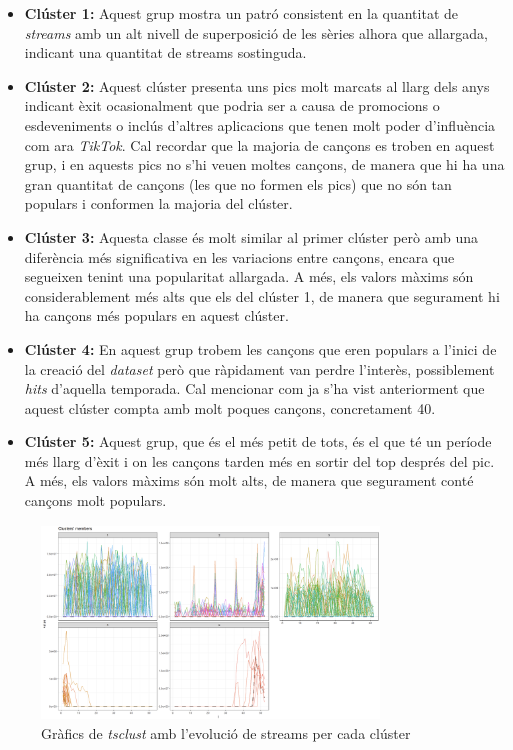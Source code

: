 \documentclass{article}
\begin{document}
\begin{itemize}
    \item \textbf{Clúster 1:} Aquest grup mostra un patró consistent en la quantitat de \textit{streams} amb un alt nivell de superposició de les sèries alhora que allargada, indicant una quantitat de streams sostinguda.
    
    \item \textbf{Clúster 2:} Aquest clúster presenta uns pics molt marcats al llarg dels anys indicant èxit ocasionalment que podria ser a causa de promocions o esdeveniments o inclús d'altres aplicacions que tenen molt poder d'influència com ara \textit{TikTok}. Cal recordar que la majoria de cançons es troben en aquest grup, i en aquests pics no s'hi veuen moltes cançons, de manera que hi ha una gran quantitat de cançons (les que no formen els pics) que no són tan populars i conformen la majoria del clúster.
    
    \item \textbf{Clúster 3:} Aquesta classe és molt similar al primer clúster però amb una diferència més significativa en les variacions entre cançons, encara que segueixen tenint una popularitat allargada. A més, els valors màxims són considerablement més alts que els del clúster 1, de manera que segurament hi ha cançons més populars en aquest clúster.
    
    \item \textbf{Clúster 4:} En aquest grup trobem les cançons que eren populars a l'inici de la creació del \textit{dataset} però que ràpidament van perdre l'interès, possiblement \textit{hits} d'aquella temporada. Cal mencionar com ja s'ha vist anteriorment que aquest clúster compta amb molt poques cançons, concretament 40.
    
    \item \textbf{Clúster 5:} Aquest grup, que és el més petit de tots, és el que té un període més llarg d'èxit i on les cançons tarden més en sortir del top després del pic. A més, els valors màxims són molt alts, de manera que segurament conté cançons molt populars.
\end{itemize}


\begin{figure}[H]
    \centering
    \includegraphics[width=0.8\textwidth]{Images/4_clustering/time_series/tsclust_sc.png}
    \caption{Gràfics de \textit{tsclust} amb l'evolució de streams per cada clúster}
    \label{fig:TS_tsclust_sc}
\end{figure}
\end{document}
